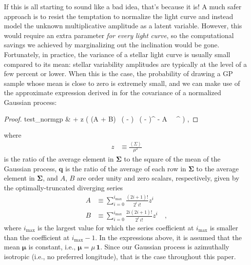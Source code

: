 \documentclass[modern]{aastex62}
\begin{document}
If this is all starting to sound like a bad idea, that's because it is!
A much safer approach is to resist the temptation to normalize the light curve
and instead model the unknown multiplicative amplitude as a latent variable. However,
this would require an extra parameter \emph{for every light curve}, so the
computational savings we achieved by marginalizing out the inclination
would be gone. Fortunately, in practice, the variance of a stellar light curve
is usually small compared to its mean: stellar variability amplitudes are
typically at the level of a few percent or lower. When this is the case,
the probability of drawing a GP sample whose mean is close to zero is
extremely small, and we can make use of the approximate expression derived
in \citet{Luger2021} for the covariance of a normalized Gaussian process:
%
\begin{proof}{test_normgp}
    \label{eq:SigmaTilde}
    \tilde{\pmb{\Sigma}}
    & \approx
     \pmb{\Sigma} +
    z \Big(
    (A + B) \, ( - ) \, ( - )^\top
    - A \,  \, ^\top
    \Big)
    \quad,
\end{proof}
%
where
%
\begin{align}
    \label{eq:z}
    z & \equiv \frac{\left< \Sigma \right>}{\mu^2}
\end{align}
%
is the ratio of the average element in $\pmb{\Sigma}$
to the square of the mean of the Gaussian process,
$\mathbf{q}$ is the ratio of the average of each row in $\pmb{\Sigma}$
to the average element in $\pmb{\Sigma}$, and $A$, $B$ are
order unity and zero scalars, respectively,
given by the optimally-truncated diverging series
%
\begin{align}
    \label{eq:baseline_alpha}
    A
     & \equiv
    \sum\limits_{i=0}^{i_\mathrm{max}}
    \frac{(2i + 1)!}{2^i \, i!}
    z^i
    \\[1em]
    \label{eq:baseline_beta}
    B
     & \equiv
    \sum\limits_{i=0}^{i_\mathrm{max}}
    \frac{2i(2i + 1)!}{2^i \, i!}
    z^i
    \quad,
\end{align}
%
where $i_\mathrm{max}$ is the largest value for which the series coefficient at $i_\mathrm{max}$ is
smaller than the coefficient at $i_\mathrm{max} - 1$. In the expressions above, it is
assumed that the mean $\pmb{\mu}$ is constant, i.e., $\pmb{\mu} = \mu\, \mathbf{1}$.
Since our Gaussian process is azimuthally isotropic (i.e., no preferred
longitude), that is the case throughout this paper.
\end{document}
